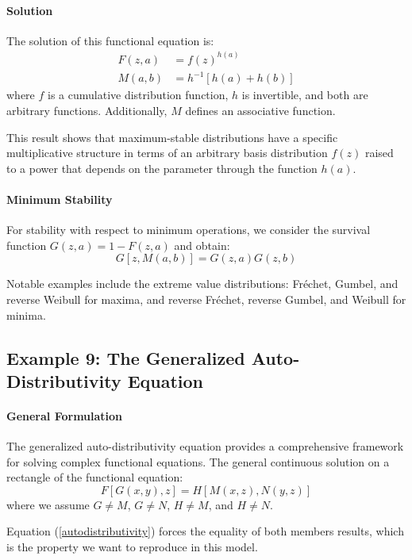 \paragraph{Solution}
The solution of this functional equation is:
\begin{align}
F(z, a) &= f(z)^{h(a)} \\
M(a, b) &= h^{-1}[h(a) + h(b)]
\end{align}
where $f$ is a cumulative distribution function, $h$ is invertible, and both are arbitrary functions. Additionally, $M$ defines an associative function.

This result shows that maximum-stable distributions have a specific multiplicative structure in terms of an arbitrary basis distribution $f(z)$ raised to a power that depends on the parameter through the function $h(a)$.

\paragraph{Minimum Stability}
For stability with respect to minimum operations, we consider the survival function $G(z, a) = 1 - F(z, a)$ and obtain:
$$G[z, M(a, b)] = G(z, a)G(z, b)$$

Notable examples include the extreme value distributions: Fréchet, Gumbel, and reverse Weibull for maxima, and reverse Fréchet, reverse Gumbel, and Weibull for minima.

\subsection{Example 9: The Generalized Auto-Distributivity Equation}
\paragraph{General Formulation}
The generalized auto-distributivity equation provides a comprehensive framework for solving complex functional equations. The general continuous solution on a rectangle of the functional equation:
\begin{equation}\label{autodistributivity}
F[G(x, y), z] = H[M(x, z), N(y, z)]
\end{equation}
where we assume $G \neq M$, $G \neq N$, $H \neq M$, and $H \neq N$.

Equation (\ref{autodistributivity}) forces the equality of both members results, which is the property we want to reproduce in this model.

